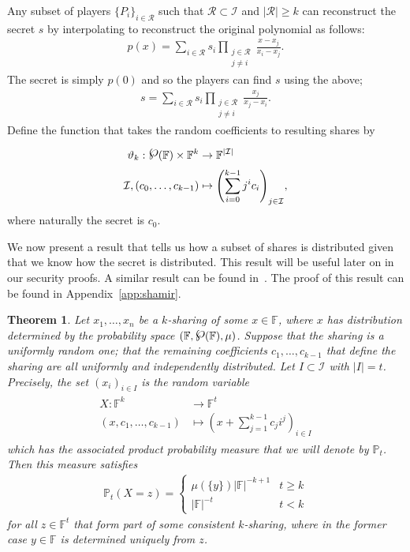 \documentclass{article}
\newcommand{\powerset}{\raisebox{.15\baselineskip}{\Large\ensuremath{\wp}}}
\newtheorem{theorem}{Theorem}
\theoremstyle{remark}
\newcommand{\F}{\mathbb{F}}
\renewcommand{\P}{\mathbb{P}}
\begin{document}
Any subset of players ${\{P_i\}}_{i \in \mathcal{R}}$ such that $\mathcal{R}
\subset \mathcal{I}$ and $|\mathcal{R}| \ge k$ can reconstruct the secret $s$
by interpolating to reconstruct the original polynomial as follows:
\begin{align*}
	p(x)
	=
	\sum_{i \in \mathcal{R}}
		s_i
		\prod_{\substack{j \in \mathcal{R}\\j \ne i}}
			\frac{x - x_j}{x_i - x_j}.
\end{align*}
The secret is simply $p(0)$ and so the players can find $s$ using the above;
\begin{align*}
	s = \sum_{i \in \mathcal{R}}
		s_i
		\prod_{\substack{j \in \mathcal{R}\\j \ne i}}
			\frac{x_j}{x_j - x_i}.
\end{align*}
Define the function that takes the random coefficients to resulting shares by
\begin{align*}
	\spl:
	\powerset(\F) \times \F^k &\to \F^{|\mathcal{I}|}\\
	\mathcal{I}, (c_0, \ldots, c_{k-1})
	&\mapsto
	{\left(\sum_{i=0}^{k-1} j^i c_i\right)}_{j \in \mathcal{I}},
\end{align*}
where naturally the secret is $c_0$.

We now present a result that tells us how a subset of shares is distributed
given that we know how the secret is distributed. This result will be useful
later on in our security proofs. A similar result can be found in~\cite{al17}.
The proof of this result can be found in Appendix~\ref{app:shamir}.

\begin{theorem}\label{thm:shareDist}
	Let $x_1, \ldots, x_n$ be a $k$-sharing of some $x \in \F$, where $x$ has
	distribution determined by the probability space $(\F, \powerset(\F),
	\mu)$. Suppose that the sharing is a uniformly random one; that the
	remaining coefficients $c_1, \ldots, c_{k-1}$ that define the sharing are
	all uniformly and independently distributed. Let $I \subset \mathcal{I}$
	with $|I| = t$. Precisely, the set ${(x_i)}_{i \in I}$ is the random
	variable
	\begin{align}\label{eq:shareDist}
		\begin{aligned}
			X: \F^k &\to \F^t\\
			(x, c_1, \ldots, c_{k-1}) &\mapsto
			{\left(x + \sum_{j=1}^{k-1} c_j i^j\right)}_{i \in I}
		\end{aligned}
	\end{align}
	which has the associated product probability measure that we will denote by
	$\P_t$. Then this measure satisfies
	\begin{align*}
		\P_t(X = z) =
		\begin{cases}
			\mu(\{y\})|\F|^{-k+1} & t \ge k\\
			|\F|^{-t} & t < k
		\end{cases}
	\end{align*}
	for all $z \in \F^t$ that form part of some consistent $k$-sharing, where
	in the former case $y \in \F$ is determined uniquely from $z$.
\end{theorem}
\end{document}
